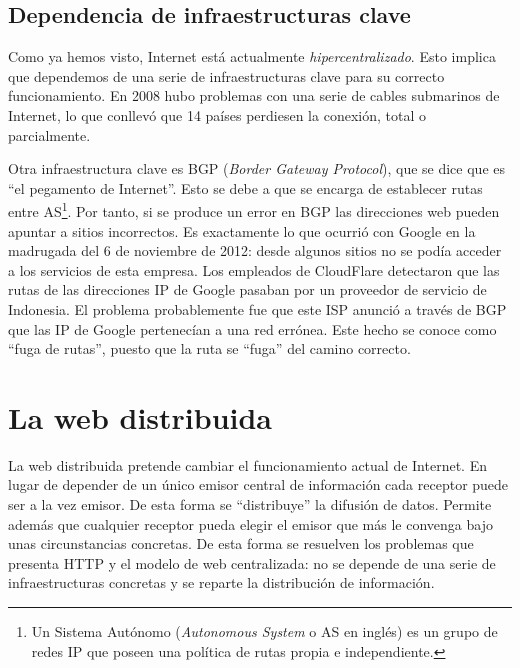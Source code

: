 \documentclass[12pt]{article} %
\begin{document}

\subsection{Dependencia de infraestructuras clave} %
\label{sub:dependencia}

Como ya hemos visto, Internet está actualmente \textit{hipercentralizado}. Esto implica que dependemos de una serie de infraestructuras clave para su correcto funcionamiento. En 2008 hubo problemas con una serie de cables submarinos de Internet, lo que conllevó que 14 países perdiesen la conexión, total o parcialmente\cite{2008-cable-disruption}.

Otra infraestructura clave es BGP (\textit{Border Gateway Protocol}), que se dice que es ``el pegamento de Internet''. Esto se debe a que se encarga de establecer rutas entre AS\footnote{Un Sistema Autónomo (\textit{Autonomous System} o AS en inglés) es un grupo de redes IP que poseen una política de rutas propia e independiente.}. Por tanto, si se produce un error en BGP las direcciones web pueden apuntar a sitios incorrectos. Es exactamente lo que ocurrió con Google en la madrugada del 6 de noviembre de 2012: desde algunos sitios no se podía acceder a los servicios de esta empresa. Los empleados de CloudFlare\cite{cloudflare-google-outage} detectaron que las rutas de las direcciones IP de Google pasaban por un proveedor de servicio de Indonesia. El problema probablemente fue que este ISP anunció a través de BGP que las IP de Google pertenecían a una red errónea. Este hecho se conoce como ``fuga de rutas'', puesto que la ruta se ``fuga'' del camino correcto.



\section{La web distribuida} %
\label{sec:la_web_distribuida}

La web distribuida pretende cambiar el funcionamiento actual de Internet. En lugar de depender de un único emisor central de información cada receptor puede ser a la vez emisor. De esta forma se ``distribuye'' la difusión de datos. Permite además que cualquier receptor pueda elegir el emisor que más le convenga bajo unas circunstancias concretas. De esta forma se resuelven los problemas que presenta HTTP y el modelo de web centralizada: no se depende de una serie de infraestructuras concretas y se reparte la distribución de información.
\end{document}

